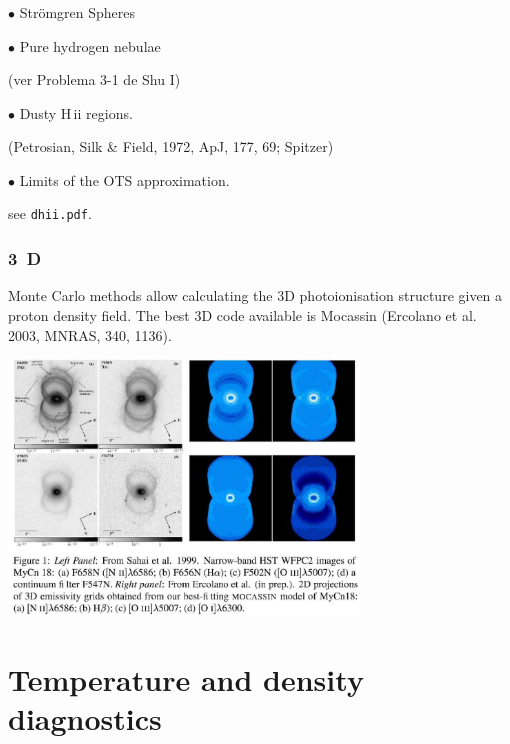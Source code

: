 \begin{frame}\frametitle{}


{$\bullet$ Str\"omgren Spheres}

{$\bullet$ Pure hydrogen nebulae}

(ver Problema 3-1 de Shu I)

{$\bullet$ Dusty H\,{\sc ii} regions.}

(Petrosian, Silk \& Field, 1972, ApJ, 177, 69; Spitzer)

{$\bullet$ Limits of the OTS approximation}.

see {\tt dhii.pdf}. 

\end{frame}
\begin{frame}\frametitle{3~D}

Monte Carlo methods allow calculating the 3D photoionisation structure
given a proton density field. The best 3D code available is Mocassin
(Ercolano et al. 2003, MNRAS, 340, 1136). 
\begin{center}
  \includegraphics[width=0.7\textwidth,height=!]{./C/MyCn18_mocassin.jpg}
\end{center}


\end{frame}
\section{Temperature and density diagnostics}
